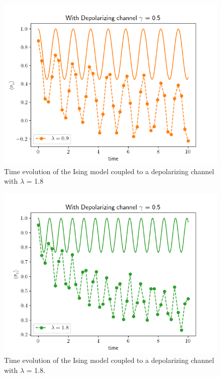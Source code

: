 \documentclass[12pt, twocolumn]{article}
\begin{document}
  \begin{figure}[!htb]
    \centering
    \includegraphics[width=\columnwidth]{images/DepolChannelLambda09.png}
    \caption{Time evolution of the Ising model coupled to a depolarizing channel with $\lambda$ = 1.8%
      \label{fig:DepolChannelLambda09}}
  \end{figure}

  \begin{figure}[!htb]
    \centering
    \includegraphics[width=\columnwidth]{images/DepolChannelLambda18.png}
    \caption{Time evolution of the Ising model coupled to a depolarizing channel with $\lambda$ = 1.8.%
      \label{fig:DepolChannelLambda18}}
  \end{figure}
\end{document}
